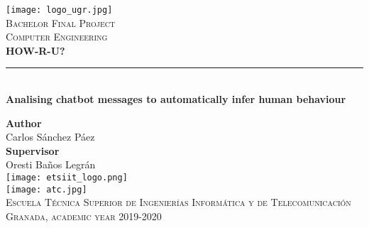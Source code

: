 \begin{titlepage}

 \newlength{\centeroffset}
 \setlength{\centeroffset}{-0.5\oddsidemargin}
 \addtolength{\centeroffset}{0.5\evensidemargin}
 \thispagestyle{empty}

 \noindent\hspace*{\centeroffset}
 \begin{minipage}{\textwidth}

  \centering
  \texttt{[image: logo\_ugr.jpg]}\\[1.4cm]

  \textsc{ \Large Bachelor Final Project\\[0.2cm]}
  \textsc{Computer Engineering}\\[1cm]

  {\Huge\bfseries HOW-R-U?\\}
  \noindent\rule[-1ex]{\textwidth}{3pt}\\[3.5ex]
  {\large\bfseries Analising chatbot messages to automatically infer human behaviour}
 \end{minipage}

 \vspace{1cm}
 \noindent\hspace*{\centeroffset}
 \begin{minipage}{\textwidth}
  \centering

  \textbf{Author}\\ {Carlos Sánchez Páez}\\[2.5ex]
  \textbf{Supervisor}\\
  {Oresti Baños Legrán}\\[3ex]
  \texttt{[image: etsiit\_logo.png]}\\[0.1cm]
  \vspace{2.5ex}
  \texttt{[image: atc.jpg]}\\[0.1cm]
  \vspace{1cm}
  \textsc{Escuela Técnica Superior de Ingenierías Informática y de Telecomunicación}\\
  \vspace{1cm}
  \textsc{Granada, academic year 2019-2020}
 \end{minipage}
\end{titlepage}
